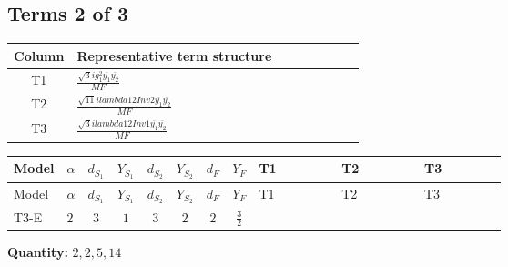 \documentclass[8pt]{article}
\begin{document}
\begin{landscape}
\subsection*{Terms 2 of 3}
\begin{center}
\begin{tabular}{@{}c >{\raggedright\arraybackslash}p{0.82\linewidth}@{}}
\toprule
Column & Representative term structure \\
\midrule
T1 & \(\displaystyle \frac{\sqrt{3} i g_{1}^{2} \overline{y_{1}} \overline{y_{2}}}{MF}\) \\
\midrule
T2 & \(\displaystyle \frac{\sqrt{11} i lambda12Inv2 \overline{y_{1}} \overline{y_{2}}}{MF}\) \\
\midrule
T3 & \(\displaystyle \frac{\sqrt{3} i lambda12Inv1 \overline{y_{1}} \overline{y_{2}}}{MF}\) \\
\midrule
\bottomrule
\end{tabular}
\end{center}
\smallskip
\tiny
\begin{longtable}{@{}llcccccc >{\raggedright\arraybackslash}p{0.21\linewidth} >{\raggedright\arraybackslash}p{0.21\linewidth} >{\raggedright\arraybackslash}p{0.21\linewidth}@{}}
\toprule
Model & $\alpha$ & $d_{S_1}$ & $Y_{S_1}$ & $d_{S_2}$ & $Y_{S_2}$ & $d_F$ & $Y_F$ & T1 & T2 & T3 \\
\midrule
\endfirsthead
\toprule
Model & $\alpha$ & $d_{S_1}$ & $Y_{S_1}$ & $d_{S_2}$ & $Y_{S_2}$ & $d_F$ & $Y_F$ & T1 & T2 & T3 \\
\midrule
\endhead
T3-E & $2$ & $3$ & $1$ & $3$ & $2$ & $2$ & $\frac{3}{2}$ & \scriptsize\adjustbox{max width=\linewidth}{$\begin{gathered} - \frac{9 \sqrt{3} i g_{1}^{2} \overline{y_{1}} \overline{y_{2}}}{8 MF}\end{gathered}$} & \scriptsize\adjustbox{max width=\linewidth}{$\begin{gathered} - \frac{3 \sqrt{11} i lambda12Inv2 \overline{y_{1}} \overline{y_{2}}}{22 MF}\end{gathered}$} & \scriptsize\adjustbox{max width=\linewidth}{$\begin{gathered} \frac{\sqrt{3} i lambda12Inv1 \overline{y_{1}} \overline{y_{2}}}{6 MF}\end{gathered}$} \\
\midrule
\bottomrule
\end{longtable}
\clearpage
\noindent\textbf{Quantity: }$\mathrm{2,2,5,14}$\par\smallskip

\end{landscape}
\end{document}
